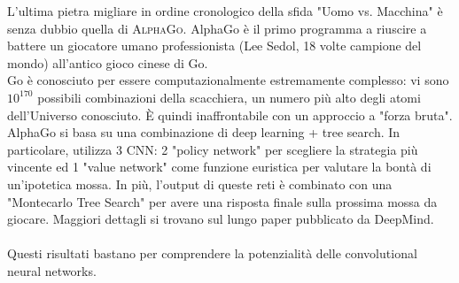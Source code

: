 L'ultima pietra migliare in ordine cronologico della sfida "Uomo vs. Macchina" è senza dubbio quella di \textsc{AlphaGo}\parencite{WAlphaGo}. AlphaGo è il primo programma a riuscire a battere un giocatore umano professionista (Lee Sedol, 18 volte campione del mondo) all'antico gioco cinese di Go. \\
Go è conosciuto per essere computazionalmente estremamente complesso: vi sono $10^{170}$ possibili combinazioni della scacchiera, un numero più alto degli atomi dell'Universo conosciuto. È quindi inaffrontabile con un approccio a "forza bruta". 
\\
AlphaGo si basa su una combinazione di deep learning + tree search. In particolare, utilizza 3 CNN: 2 "policy network" per scegliere la strategia più vincente ed 1 "value network" come funzione euristica per valutare la bontà di un'ipotetica mossa. In più, l'output di queste reti è combinato con una "Montecarlo Tree Search" per avere una risposta finale sulla prossima mossa da giocare. Maggiori dettagli si trovano sul lungo paper pubblicato da DeepMind\parencite{AlphaGo}. \\
\\
Questi risultati bastano per comprendere la potenzialità delle convolutional neural networks.
